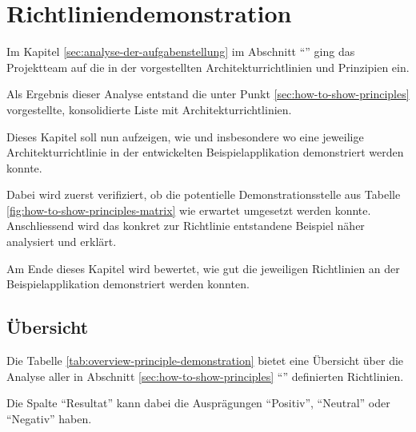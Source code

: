 \chapter{Richtliniendemonstration}
\label{sec:principle-demonstration}

Im Kapitel \ref{sec:analyse-der-aufgabenstellung} im Abschnitt ``'' ging das Projektteam auf die in der  vorgestellten Architekturrichtlinien und Prinzipien ein.

Als Ergebnis dieser Analyse entstand die unter Punkt \ref{sec:how-to-show-principles} vorgestellte, konsolidierte Liste mit Architekturrichtlinien.

Dieses Kapitel soll nun aufzeigen, wie und insbesondere wo eine jeweilige Architekturrichtlinie in der entwickelten Beispielapplikation demonstriert werden konnte.

Dabei wird zuerst verifiziert, ob die potentielle Demonstrationsstelle aus Tabelle \ref{fig:how-to-show-principles-matrix} wie erwartet umgesetzt werden konnte.
Anschliessend wird das konkret zur Richtlinie entstandene Beispiel näher analysiert und erklärt.

Am Ende dieses Kapitel wird bewertet, wie gut die jeweiligen Richtlinien an der Beispielapplikation demonstriert werden konnten.

\newpage
\section{Übersicht}

Die Tabelle \ref{tab:overview-principle-demonstration} bietet eine Übersicht über die Analyse aller in Abschnitt \ref{sec:how-to-show-principles} ``'' definierten Richtlinien.

Die Spalte ``Resultat'' kann dabei die Ausprägungen ``Positiv'', ``Neutral'' oder ``Negativ'' haben.

